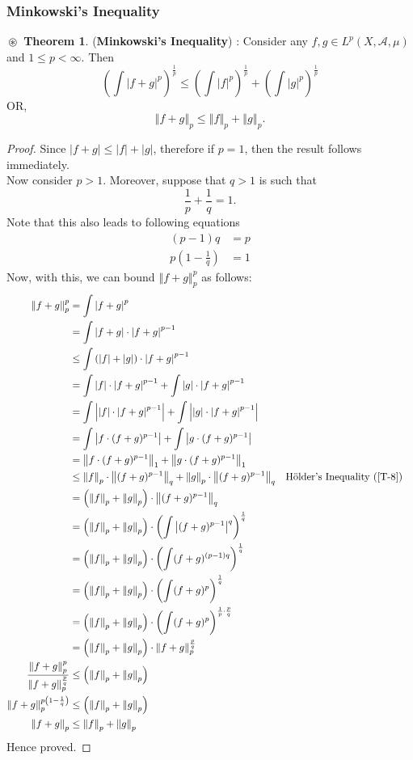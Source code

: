 \documentclass{article}
\theoremstyle{definition}
\newtheorem{theorem}{$\boxed{\boxed{\circledast}}$ Theorem}
\theoremstyle{remark}
\theoremstyle{definition}
\theoremstyle{definition}
\theoremstyle{definition}
\newcommand{\abs}[1]{\left \vert #1\right \vert}
\newcommand{\norm}[1]{\left \Vert #1 \right \Vert}
\newcommand{\alg}[1]{\mathscr{#1}}
\newcommand{\Lp}[1]{L^{p}\left (#1\right )}
\newcommand{\wnorm}[2]{\left (\int \abs{#2}^{#1}\right )^{\frac{1}{#1}}}
\begin{document}
\subsubsection{Minkowski's Inequality}
\begin{theorem}\label{T-9}
	(\textbf{Minkowski's Inequality}) : Consider any $ f,g \in \Lp{X,\alg{A},\mu} $ and $ 1\le p < \infty $. Then
	\[\wnorm{p}{f +g} \le \wnorm{p}{f} + \wnorm{p}{g}\]
	OR, 
	\[\norm{f +g}_p \le \norm{f}_p + \norm{g}_p.\]
\end{theorem}
\begin{proof}
	Since $ \abs{f+g} \le \abs{f} + \abs{g} $, therefore if $ p = 1 $, then the result follows immediately. \\
	Now consider $ p > 1 $. Moreover, suppose that $ q> 1 $ is such that
	\[\frac{1}{p} + \frac{1}{q} = 1.\]
	Note that this also leads to following equations
	\begin{align*}
		(p-1)q &= p\\
		p\left (1-\frac{1}{q}\right ) &=1
	\end{align*}
	Now, with this, we can bound $ \norm{f+ g}_p^{p} $ as follows:
	\begin{align*}
		\norm{f+g}_{p}^{p} &= \int \abs{f+g}^{p}\\
		&= \int \abs{f+g} \cdot \abs{f+g}^{p-1}\\
		&\le \int \left (\abs{f} + \abs{g}\right )\cdot \abs{f+g}^{p-1}\\
		&= \int \abs{f}\cdot \abs{f+g}^{p-1} + \int \abs{g}\cdot \abs{f+g}^{p-1}\\
		&= \int \abs{\abs{f} \cdot\abs{f+g}^{p-1}} + \int \abs{\abs{g}\cdot \abs{f+g}^{p-1} }\\
		&= \int \abs{f\cdot (f+g)^{p-1}} + \int \abs{g \cdot (f+g)^{p-1}}\\
		&= \norm{f\cdot (f+g)^{p-1}}_1 + \norm{g\cdot (f+g)^{p-1}}_1\\
		&\le \norm{f}_p \cdot\norm{(f+g)^{p-1}}_q + \norm{g}_p\cdot \norm{(f+g)^{p-1}}_q&&\text{H\"older's Inequality (\ref{T-8})}\\
		&= \left (\norm{f}_p + \norm{g}_p\right )\cdot \norm{(f+g)^{p-1}}_q\\
		&= \left (\norm{f}_p + \norm{g}_p\right ) \cdot \wnorm{q}{(f+g)^{p-1}}\\
		&= \left (\norm{f}_p + \norm{g}_p\right ) \cdot \left (\int (f+g)^{(p-1)q}\right )^{\frac{1}{q}}\\
		&= \left (\norm{f}_p + \norm{g}_p\right ) \cdot \left (\int (f+g)^{p}\right )^{\frac{1}{q}}\\
		&= \left (\norm{f}_p + \norm{g}_p\right )\cdot \left (\int (f+g)^{p}\right )^{\frac{1}{p}\cdot \frac{p}{q}}\\
	 &= \left (\norm{f}_p + \norm{g}_p\right )\cdot \norm{f+g}_p^{\frac{p}{q}}\\
		\frac{\norm{f+g}_p^{p}}{\norm{f+g}_p^{\frac{p}{q}}} &\le  \left (\norm{f}_p + \norm{g}_p\right )\\
		\norm{f+g}_p^{p\left (1-\frac{1}{q}\right )} &\le  \left (\norm{f}_p + \norm{g}_p\right )\\
		\norm{f+g}_p &\le \norm{f}_p + \norm{g}_p
	\end{align*}
Hence proved.
\end{proof}
\end{document}
